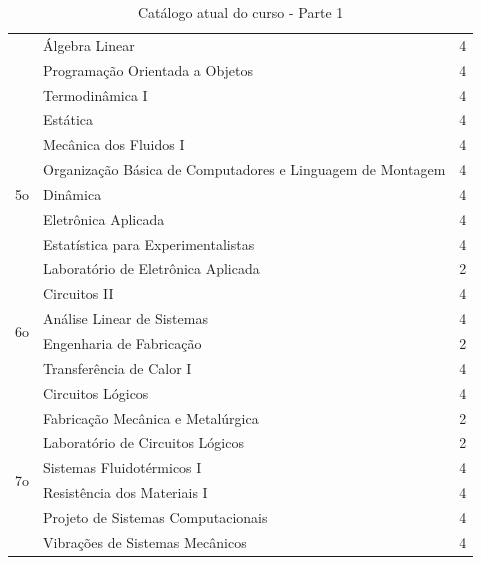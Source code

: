 \documentclass[12pt]{article} %
\begin{document}
\begin{table}[H]
\begin{tabular}{|c|l|c|}
                     & Álgebra Linear                                             & 4        \\ \cline{2-3} 
                     & Programação Orientada a Objetos                            & 4        \\ \cline{2-3} 
                     & Termodinâmica I                                            & 4        \\ \cline{2-3} 
                     & Estática                                                   & 4        \\ \hline
\multirow{5}{*}{5o}  & Mecânica dos Fluidos I                                     & 4        \\ \cline{2-3} 
                     & Organização Básica de Computadores e Linguagem de Montagem & 4        \\ \cline{2-3} 
                     & Dinâmica                                                   & 4        \\ \cline{2-3} 
                     & Eletrônica Aplicada                                        & 4        \\ \cline{2-3} 
                     & Estatística para Experimentalistas                         & 4        \\ \hline
\multirow{6}{*}{6o}  & Laboratório de Eletrônica Aplicada                         & 2        \\ \cline{2-3} 
                     & Circuitos II                                               & 4        \\ \cline{2-3} 
                     & Análise Linear de Sistemas                                 & 4        \\ \cline{2-3} 
                     & Engenharia de Fabricação                                   & 2        \\ \cline{2-3} 
                     & Transferência de Calor I                                   & 4        \\ \cline{2-3} 
                     & Circuitos Lógicos                                          & 4        \\ \hline
\multirow{6}{*}{7o}  & Fabricação Mecânica e Metalúrgica                          & 2        \\ \cline{2-3} 
                     & Laboratório de Circuitos Lógicos                           & 2        \\ \cline{2-3} 
                     & Sistemas Fluidotérmicos I                                  & 4        \\ \cline{2-3} 
                     & Resistência dos Materiais I                                & 4        \\ \cline{2-3} 
                     & Projeto de Sistemas Computacionais                         & 4        \\ \cline{2-3} 
                     & Vibrações de Sistemas Mecânicos                            & 4        \\ \hline
\end{tabular}
\caption{Catálogo atual do curso -  Parte 1}
\label{catalago1}
\end{table}
\end{document}
